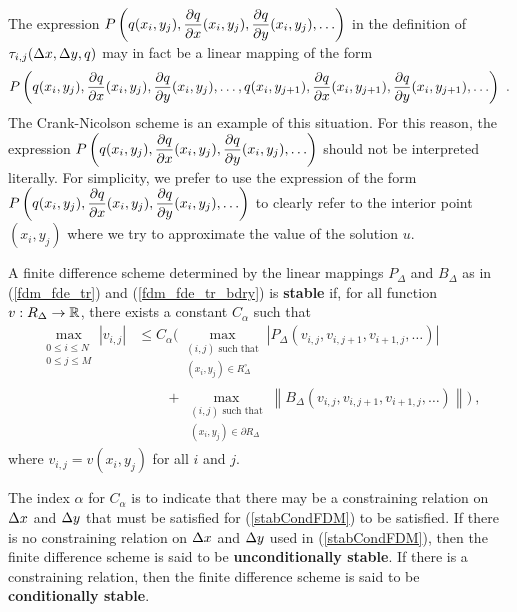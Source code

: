 \begin{rmk}[Warning]
The expression
$\displaystyle P\left(q(x_i,y_j), \frac{\partial{q}}{\partial{x}}(x_i,y_j), \frac{\partial{q}}{\partial{y}}(x_i,y_j),
\ldots \right)$ in the definition of
$\displaystyle \tau_{i,j}(\Delta{x},\Delta{y},q)$ may in fact be
a linear mapping of the form
\[
  P\left(q(x_i,y_j), \frac{\partial{q}}{\partial{x}}(x_i,y_j), \frac{\partial{q}}{\partial{y}}(x_i,y_j),
\ldots, q(x_i,y_{j+1}), \frac{\partial{q}}{\partial{x}}(x_i,y_{j+1}),
\frac{\partial{q}}{\partial{y}}(x_i,y_{j+1}), \ldots \right) \ .
\]
The Crank-Nicolson scheme is an example of this situation.
For this reason, the expression
$\displaystyle P\left(q(x_i,y_j), \frac{\partial{q}}{\partial{x}}(x_i,y_j), \frac{\partial{q}}{\partial{y}}(x_i,y_j),
\ldots \right)$ should not be interpreted literally.
For simplicity, we prefer to use the expression of the form
$\displaystyle P\left(q(x_i,y_j), \frac{\partial{q}}{\partial{x}}(x_i,y_j), \frac{\partial{q}}{\partial{y}}(x_i,y_j),
\ldots \right)$ to clearly refer to the interior point $(x_i,y_j)$ 
where we try to approximate the value of the solution $u$.
\end{rmk}

\begin{defn}\label{fdmStableDefNo1}
A finite difference scheme determined by the linear mappings
$P_\Delta$ and $B_\Delta$ as in (\ref{fdm_fde_tr}) and
(\ref{fdm_fde_tr_bdry}) is
{\bfseries stable} if,
for all function $v: R_\Delta \to \mathbb{R}$, there exists
a constant $C_\alpha$ such that
\begin{equation} \label{stabCondFDM}
\begin{split}
\max_{\substack{0\leq i\leq N\\0\leq j \leq M}} |v_{i,j}| &\leq
C_\alpha \bigg(
\max_{\substack{(i,j) \text{ such that}\\(x_i,y_j)\in R^\circ_\Delta}}
\left| P_\Delta\left(v_{i,j}, v_{i,j+1}, v_{i+1,j},\ldots\right) \right| \\
&\qquad
+ \max_{\substack{(i,j) \text{ such that}\\ (x_i,y_j)\in \partial R_\Delta}}
\left\| B_\Delta\left(v_{i,j},v_{i,j+1},v_{i+1,j}, \ldots\right) \right\|
\bigg) \ ,
\end{split}
\end{equation}
where $v_{i,j} = v(x_i,y_j)$ for all $i$ and $j$.

The index $\alpha$ for $C_\alpha$ is to indicate that there may be a
constraining relation on $\Delta{x}$ and $\Delta{y}$ that must be
satisfied for (\ref{stabCondFDM}) to be satisfied.  If there is no
constraining relation on $\Delta{x}$ and $\Delta{y}$ used in
(\ref{stabCondFDM}), then the finite difference scheme is said to be
{\bfseries unconditionally stable}.
If there is a constraining relation, then the finite difference scheme
is said to be {\bfseries conditionally stable}.
\end{defn}

